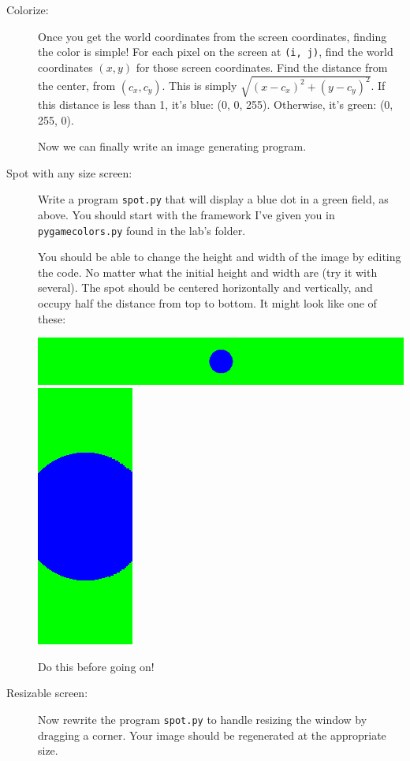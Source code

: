 \documentclass[12pt]{article}
\begin{document}
\begin{description}
\item[Colorize:] Once you get the world coordinates from
the screen coordinates, finding the color is simple!
For each pixel on the screen at \lstinline{(i, j)}, find the
world coordinates $(x,y)$ for those screen coordinates.
Find the distance from the center, from $(c_x, c_y)$.
This is simply $\sqrt{(x-c_x)^2 + (y-c_y)^2}$.
If this distance is less than 1, it's blue: (0, 0, 255).  
Otherwise,
it's green: (0, 255, 0).

Now we can finally write an image generating program.

\item[Spot with any size screen:]  
Write a program \lstinline{spot.py}
that will display a blue dot in a green field, as above.
You should start with the framework I've given you in
\lstinline{pygamecolors.py} found in the lab's folder.

You should be able to change the height and width
of the image by editing the code.
No matter what the initial height and width are (try it
with several). The spot should be centered horizontally
and vertically, and occupy half the distance from top to
bottom.  It might look like one of these:

\includegraphics[scale=0.5]{spot02}\hfill
\includegraphics[scale=0.25]{spot03}\hfill ~

Do this before going on!

\item[Resizable screen:]  Now rewrite the program
\lstinline{spot.py} to handle resizing the window by dragging a corner.
Your image should
be regenerated at the appropriate size.


\end{description}
\end{document}
